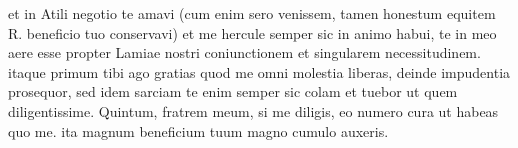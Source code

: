 


et in Atili negotio te amavi (cum enim sero venissem, tamen honestum equitem R. beneficio tuo conservavi) et me hercule semper sic in animo habui, te in meo aere esse propter Lamiae nostri coniunctionem et singularem necessitudinem. itaque primum tibi ago gratias quod me omni
molestia liberas, deinde impudentia prosequor, sed idem sarciam te enim semper sic colam et tuebor ut quem diligentissime.  Quintum, fratrem meum, si me diligis, eo numero cura ut habeas quo me. ita magnum beneficium tuum magno cumulo auxeris.
